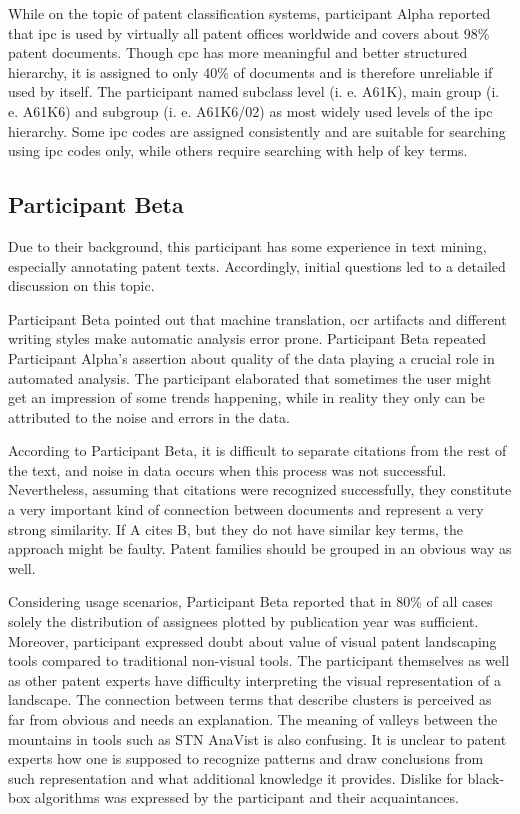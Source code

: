 While on the topic of patent classification systems, participant Alpha reported that \gls{ipc} is used by virtually all patent offices worldwide and covers about 98\% patent documents.
Though \gls{cpc} has more meaningful and better structured hierarchy, it is assigned to only 40\% of documents and is therefore unreliable if used by itself.
The participant named subclass level (i. e. A61K), main group (i. e. A61K6) and subgroup (i. e. A61K6/02) as most widely used levels of the \gls{ipc} hierarchy.
Some \gls{ipc} codes are assigned consistently and are suitable for searching using \gls{ipc} codes only, while others require searching with help of key terms. 

\subsection{Participant Beta}
\label{subsec:participant_beta}

Due to their background, this participant has some experience in text mining, especially annotating patent texts.
Accordingly, initial questions led to a detailed discussion on this topic.

Participant Beta pointed out that machine translation, \gls{ocr} artifacts and different writing styles make automatic analysis error prone.
Participant Beta repeated Participant Alpha's assertion about quality of the data playing a crucial role in automated analysis.
The participant elaborated that sometimes the user might get an impression of some trends happening, while in reality they only can be attributed to the noise and errors in the data.

According to Participant Beta, it is difficult to separate citations from the rest of the text, and noise in data occurs when this process was not successful. 
Nevertheless, assuming that citations were recognized successfully, they constitute a very important kind of connection between documents and represent a very strong similarity. 
If A cites B, but they do not have similar key terms, the approach might be faulty.
Patent families should be grouped in an obvious way as well.

Considering usage scenarios, Participant Beta reported that in 80\% of all cases solely the distribution of assignees plotted by publication year was sufficient.
Moreover, participant expressed doubt about value of visual patent landscaping tools compared to traditional non-visual tools.
The participant themselves as well as other patent experts have difficulty interpreting the visual representation of a landscape.
The connection between terms that describe clusters is perceived as far from obvious and needs an explanation.
The meaning of valleys between the mountains in tools such as STN AnaVist is also confusing.
It is unclear to patent experts how one is supposed to recognize patterns and draw conclusions from such representation and what additional knowledge it provides.
Dislike for black-box algorithms was expressed by the participant and their acquaintances.

